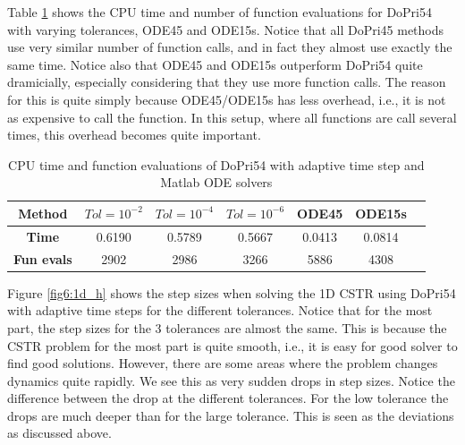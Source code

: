 Table \ref{tab6:1d_cstr} shows the CPU time and number of function evaluations for DoPri54 with varying tolerances, ODE45 and ODE15s. Notice that all DoPri45 methods use very similar number of function calls, and in fact they almost use exactly the same time. Notice also that ODE45 and ODE15s outperform DoPri54 quite dramicially, especially considering that they use more function calls. The reason for this is quite simply because ODE45/ODE15s has less overhead, i.e., it is not as expensive to call the function. In this setup, where all functions are call several times, this overhead becomes quite important. 

\begin{table}[H]
    \centering
    \caption{CPU time and function evaluations of DoPri54 with adaptive time step and Matlab ODE solvers}
    \begin{tabular}{|c||c|c|c|c|c|c|} \hline
         \textbf{Method}    & $Tol = 10^{-2}$&   $Tol = 10^{-4}$ & $Tol = 10^{-6}$ & ODE45 & ODE15s     \\ \hline \hline 
         \textbf{Time}      & 0.6190 &   0.5789  &  0.5667 & 0.0413 & 0.0814   \\ \hline
         \textbf{Fun evals} &  2902  &   2986    &  3266   &   5886 & 4308  \\ \hline
    \end{tabular}
    \label{tab6:1d_cstr}
\end{table}

Figure \ref{fig6:1d_h} shows the step sizes when solving the 1D CSTR using DoPri54 with adaptive time steps for the different tolerances. Notice that for the most part, the step sizes for the 3 tolerances are almost the same. This is because the CSTR problem for the most part is quite smooth, i.e., it is easy for good solver to find good solutions. However, there are some areas where the problem changes dynamics quite rapidly. We see this as very sudden drops in step sizes. Notice the difference between the drop at the different tolerances. For the low tolerance the drops are much deeper than for the large tolerance. This is seen as the deviations as discussed above.

